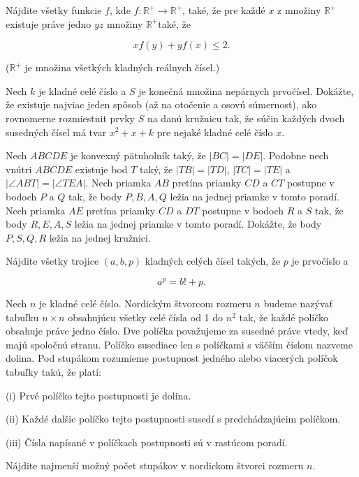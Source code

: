 {%
Nájdite všetky funkcie $f$, kde $f: \mathbb{R}^{+} \rightarrow \mathbb{R}^{+}$, také, že pre každé $x$ z množiny $\mathbb{R}^{+}$existuje práve jedno $y z$ množiny $\mathbb{R}^{+}$také, že

$$
xf(y)+yf(x) \leq 2.
$$

($\mathbb{R}^{+}$ je množina všetkých kladných reálnych čísel.)}

{%
Nech $k$ je kladné celé číslo a $S$ je konečná množina nepárnych prvočísel. Dokážte, že existuje najviac jeden spôsob (až na otočenie a osovú súmernost), ako rovnomerne rozmiestnit prvky $S$ na danú kružnicu tak, že súčin každých dvoch susedných čísel má tvar $x^{2}+x+k$ pre nejaké kladné celé číslo $x$.}

{%
Nech $A B C D E$ je konvexný pätuholník taký, že $|B C|=|D E|$. Podobne nech vnútri $A B C D E$ existuje bod $T$ taký, že $|T B|=|T D|$, $|T C|=|T E|$ a $|\angle A B T|=|\angle T E A|$. Nech priamka $A B$ pretína priamky $C D$ a $C T$ postupne v bodoch $P$ a $Q$ tak, že body $P, B, A, Q$ ležia na jednej priamke v tomto poradí. Nech priamka $A E$ pretína priamky $C D$ a $D T$ postupne v bodoch $R$ a $S$ tak, že body $R, E, A, S$ ležia na jednej priamke v tomto poradí. Dokážte, že body $P, S, Q, R$ ležia na jednej kružnici.}

{%
Nájdite všetky trojice $(a, b, p)$ kladných celých čísel takých, že $p$ je prvočíslo a

$$
a^{p}=b!+p.
$$}

{%
Nech $n$ je kladné celé číslo. Nordickým štvorcom rozmeru $n$ budeme nazývať tabuľku $n \times n$ obsahujúcu všetky celé čísla od 1 do $n^{2}$ tak, že každé políčko obsahuje práve jedno číslo. Dve políčka považujeme za susedné práve vtedy, keď majú spoločnú stranu. Políčko susediace len s políčkami s väčším číslom nazveme dolina. Pod stupákom rozumieme postupnost jedného alebo viacerých políčok tabuľky takú, že platí:

\item{(i)} Prvé políčko tejto postupnosti je dolina.
\item{(ii)} Každé dalšie políčko tejto postupnosti susedí s predchádzajúcim políčkom.
\item{(iii)} Čísla napísané v políčkach postupnosti sú v rastúcom poradí.

Nájdite najmenší možný počet stupákov v nordickom štvorci rozmeru $n$.}

